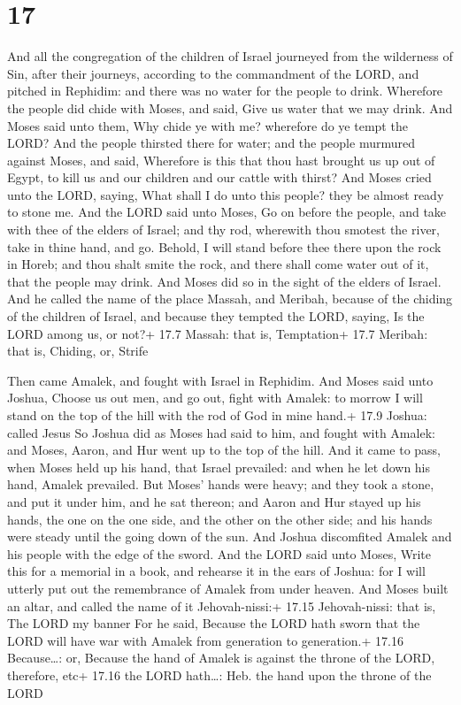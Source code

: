 \hypertarget{section-16}{%
\section{17}\label{section-16}}

 And all the congregation of the children of Israel
journeyed from the wilderness of Sin, after their journeys, according to
the commandment of the LORD, and pitched in Rephidim: and there was no
water for the people to drink.  Wherefore the people did
chide with Moses, and said, Give us water that we may drink. And Moses
said unto them, Why chide ye with me? wherefore do ye tempt the LORD?
 And the people thirsted there for water; and the people
murmured against Moses, and said, Wherefore is this that thou hast
brought us up out of Egypt, to kill us and our children and our cattle
with thirst?  And Moses cried unto the LORD, saying, What
shall I do unto this people? they be almost ready to stone me.
 And the LORD said unto Moses, Go on before the people, and
take with thee of the elders of Israel; and thy rod, wherewith thou
smotest the river, take in thine hand, and go.  Behold, I
will stand before thee there upon the rock in Horeb; and thou shalt
smite the rock, and there shall come water out of it, that the people
may drink. And Moses did so in the sight of the elders of Israel.
 And he called the name of the place Massah, and Meribah,
because of the chiding of the children of Israel, and because they
tempted the LORD, saying, Is the LORD among us, or not?+ 17.7 Massah:
that is, Temptation+ 17.7 Meribah: that is, Chiding, or, Strife

 Then came Amalek, and fought with Israel in Rephidim.
 And Moses said unto Joshua, Choose us out men, and go out,
fight with Amalek: to morrow I will stand on the top of the hill with
the rod of God in mine hand.+ 17.9 Joshua: called Jesus  So
Joshua did as Moses had said to him, and fought with Amalek: and Moses,
Aaron, and Hur went up to the top of the hill.  And it came
to pass, when Moses held up his hand, that Israel prevailed: and when he
let down his hand, Amalek prevailed.  But Moses' hands were
heavy; and they took a stone, and put it under him, and he sat thereon;
and Aaron and Hur stayed up his hands, the one on the one side, and the
other on the other side; and his hands were steady until the going down
of the sun.  And Joshua discomfited Amalek and his people
with the edge of the sword.  And the LORD said unto Moses,
Write this for a memorial in a book, and rehearse it in the ears of
Joshua: for I will utterly put out the remembrance of Amalek from under
heaven.  And Moses built an altar, and called the name of
it Jehovah-nissi:+ 17.15 Jehovah-nissi: that is, The LORD my banner
 For he said, Because the LORD hath sworn that the LORD
will have war with Amalek from generation to generation.+ 17.16
Because\ldots: or, Because the hand of Amalek is against the throne of
the LORD, therefore, etc+ 17.16 the LORD hath\ldots: Heb. the hand upon
the throne of the LORD


